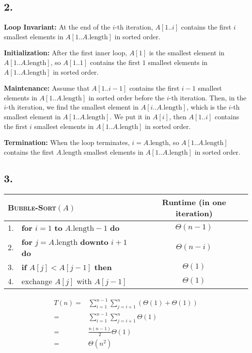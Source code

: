 \documentclass[a4paper,12pt]{article}
\begin{document}
\subsection*{2.}

\textbf{Loop Invariant:} At the end of the $i$-th iteration, $A[1..i]$ contains the first $i$ smallest elements in $A[1..A.\text{length}]$ in sorted order.

\textbf{Initialization:} After the first inner loop, $A[1]$ is the smallest element in $A[1..A.\text{length}]$, so $A[1..1]$ contains the first $1$ smallest elements in $A[1..A.\text{length}]$ in sorted order.

\textbf{Maintenance:} Assume that $A[1..i-1]$ contains the first $i-1$ smallest elements in $A[1..A.\text{length}]$ in sorted order before the $i$-th iteration.
Then, in the $i$-th iteration, we find the smallest element in $A[i..A.\text{length}]$, which is the $i$-th smallest element in $A[1..A.\text{length}]$.
We put it in $A[i]$, then $A[1..i]$ contains the first $i$ smallest elements in $A[1..A.\text{length}]$ in sorted order.

\textbf{Termination:} When the loop terminates, $i = A.\text{length}$, so $A[1..A.\text{length}]$ contains the first $A.\text{length}$ smallest elements in $A[1..A.\text{length}]$ in sorted order.

\subsection*{3.}

\begin{center}
	\begin{tabular}{llc}
		\toprule
		\multicolumn{2}{l}{\textsc{Bubble-Sort}$(A)$} & Runtime (in one iteration)\\
		\midrule
		1. & \textbf{for} $i = 1$ \textbf{to} $A.\text{length} - 1$ \textbf{do} & $\Theta(n - 1)$ \\
		2. & \quad \textbf{for} $j = A.\text{length}$ \textbf{downto} $i + 1$ \textbf{do} & $\Theta(n - i)$ \\
		3. & \quad \quad \textbf{if} $A[j] < A[j-1]$ \textbf{then} & $\Theta(1)$ \\
		4. & \quad \quad \quad exchange $A[j]$ with $A[j-1]$ & $\Theta(1)$ \\
		\bottomrule
	\end{tabular}
\end{center}

\begin{align*}
	T(n) =& \sum_{i=1}^{n-1} \sum_{j=i+1}^{n} (\Theta(1) + \Theta(1))\\
	=& \sum_{i=1}^{n-1} \sum_{j=i+1}^{n} \Theta(1)\\
	=& \frac{n(n-1)}{2} \Theta(1)\\
	=& \Theta(n^2)
\end{align*}
\end{document}
